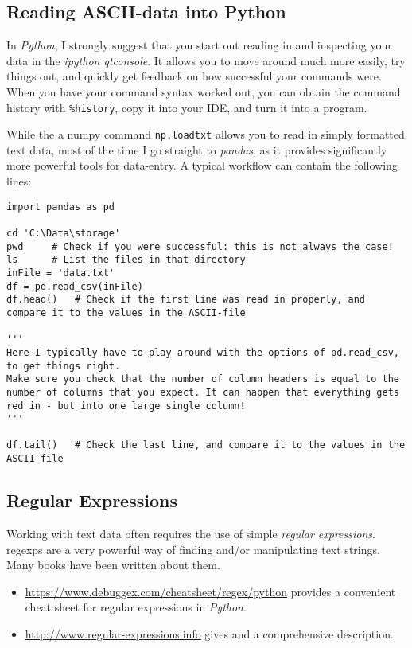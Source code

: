 \subsection{Reading ASCII-data into Python}

In \emph{Python}, I strongly suggest that you start out reading in and inspecting your data in the \emph{ipython qtconsole}. It allows you to move around much more easily, try things out, and quickly get feedback on how successful your commands were. When you have your command syntax worked out, you can obtain the command history with \lstinline{%history}, copy it into your IDE, and turn it into a program.

While the a numpy command \lstinline{np.loadtxt} allows you to read in simply formatted text data, most of the time I go straight to \emph{pandas}, as it provides significantly more powerful tools for data-entry. A typical workflow can contain the following lines:

\begin{lstlisting}
import pandas as pd

cd 'C:\Data\storage'
pwd     # Check if you were successful: this is not always the case!
ls      # List the files in that directory
inFile = 'data.txt'
df = pd.read_csv(inFile)
df.head()   # Check if the first line was read in properly, and compare it to the values in the ASCII-file

'''
Here I typically have to play around with the options of pd.read_csv, to get things right.
Make sure you check that the number of column headers is equal to the number of columns that you expect. It can happen that everything gets red in - but into one large single column!
'''

df.tail()   # Check the last line, and compare it to the values in the ASCII-file
\end{lstlisting}

\subsection{Regular Expressions}

Working with text data often requires the use of simple \emph{regular expressions}. \Glspl{regexp} are a very powerful way of finding and/or manipulating text strings. Many books have been written about them.

\begin{itemize}
  \item \url{https://www.debuggex.com/cheatsheet/regex/python} provides a convenient cheat sheet for regular expressions in \emph{Python}.
  \item \url{http://www.regular-expressions.info} gives and a comprehensive description.
\end{itemize}

